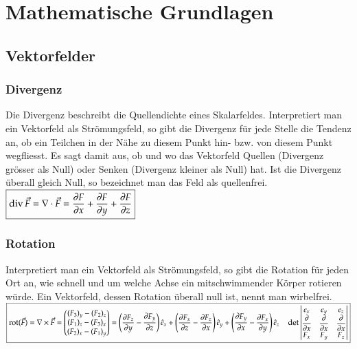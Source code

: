 \section{Mathematische Grundlagen}
\subsection{Vektorfelder}
\subsubsection{Divergenz}
	Die Divergenz beschreibt die Quellendichte eines Skalarfeldes. 
	Interpretiert man ein Vektorfeld als Strömungsfeld, so gibt die Divergenz für jede
	Stelle die Tendenz an, ob ein Teilchen in der Nähe zu diesem Punkt hin- bzw.
	von diesem Punkt wegfliesst. Es sagt damit aus, ob und wo das Vektorfeld Quellen
	(Divergenz grösser als Null) oder Senken (Divergenz kleiner als Null) hat. Ist
	die Divergenz überall gleich Null, so bezeichnet man das Feld als quellenfrei.\\
	
	$\boxed{\operatorname{div} \vec{F}=\nabla \cdot \vec{F}= \frac{\partial F}{\partial x}+\frac{\partial F}{\partial y}+\frac{\partial F}{\partial z}}$

\subsubsection{Rotation}
Interpretiert man ein Vektorfeld als Strömungsfeld, so gibt die Rotation für jeden
Ort an, wie schnell und um welche Achse ein mitschwimmender Körper rotieren
würde. Ein Vektorfeld, dessen Rotation überall null ist, nennt man wirbelfrei.\\

$\boxed{\operatorname{rot}(\vec F)=\nabla\times\vec{F} = 
	\begin{pmatrix}
	(F_3)_y - (F_2)_z\\
	(F_1)_z - (F_3)_x\\
	(F_2)_x - (F_1)_y
	\end{pmatrix} = \left({\frac {\partial F_{z}}{\partial y}}-{\frac {\partial F_{y}}{\partial z}}\right){\hat {e}}_{x}+\left({\frac {\partial F_{x}}{\partial z}}-{\frac {\partial F_{z}}{\partial x}}\right){\hat {e}}_{y}+\left({\frac {\partial F_{y}}{\partial x}}-{\frac {\partial F_{x}}{\partial y}}\right){\hat {e}}_{z} \quad 
	\det
	\begin{vmatrix}
	e_x & e_y&e_z\\
	\dfrac{\partial}{\partial x} & \dfrac{\partial}{\partial x}& \dfrac{\partial}{\partial x}\\
	F_x& F_y & F_z
	\end{vmatrix}}$


